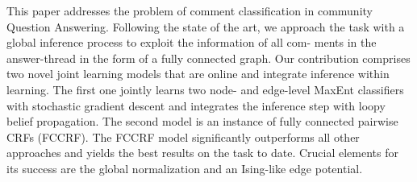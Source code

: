 This paper addresses the problem of comment classification in community Question Answering. Following the state of the art, we approach the task with a global inference process to exploit the information of all com- ments in the answer-thread in the form of a fully connected graph. Our contribution comprises two novel joint learning models that are online and integrate inference within learning. The first one jointly learns two node- and edge-level MaxEnt classifiers with stochastic gradient descent and integrates the inference step with loopy belief propagation. The second model is an instance of fully connected pairwise CRFs (FCCRF). The FCCRF model significantly outperforms all other approaches and yields the best results on the task to date. Crucial elements for its success are the global normalization and an Ising-like edge potential.

